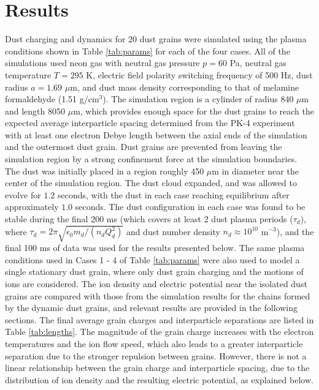 \documentclass[aip,amsmath,amssymb,graphicx,floatfix,reprint]{revtex4-1}
\begin{document}
\section{Results}
\label{results}
Dust charging and dynamics for 20 dust grains were simulated using the plasma conditions shown in Table \ref{tab:params} for each of the four cases.  All of the simulations used neon gas with neutral gas pressure $p = 60$ Pa, neutral gas temperature $T= 295$ K, electric field polarity switching frequency of 500 Hz, dust radius $a = 1.69$ $ \mu$m, and dust mass density corresponding to that of melamine formaldehyde (1.51 g/cm$^3$).  The simulation region is a cylinder of radius 840 $\mu$m and length 8050 $\mu$m, which provides enough space for the dust grains to reach the expected average interparticle spacing determined from the PK-4 experiment with at least one electron Debye length between the axial ends of the simulation and the outermost dust grain.  Dust grains are prevented from leaving the simulation region by a strong confinement force at the simulation boundaries.  The dust was initially placed in a region roughly 450 $\mu$m in diameter near the center of the simulation region.  The dust cloud expanded, and was allowed to evolve for $1.2$ seconds, with the dust in each case reaching equilibrium after approximately $1.0$ seconds.  The dust configuration in each case was found to be stable during the final 200 ms (which covers at least 2 dust plasma periods ($\tau_d$), where $\tau_d = 2\pi \sqrt{\epsilon_0 m_d/(n_{d}Q_d^2)}$ and dust number density $n_d \approx 10^{10}$ m$^{-3}$), and the final 100 ms of data was used for the results presented below.  The same plasma conditions used in Cases 1 - 4 of Table \ref{tab:params} were also used to model a single stationary dust grain, where only dust grain charging and the motions of ions are considered.  The ion density and electric potential near the isolated dust grains are compared with those from the simulation results for the chains formed by the dynamic dust grains, and relevant results are provided in the following sections.  The final average grain charges and interparticle separations are listed in Table \ref{tab:lengths}.  The magnitude of the grain charge increases with the electron temperatures and the ion flow speed, which also leads to a greater interparticle separation due to the stronger repulsion between grains.  However, there is not a linear relationship between the grain charge and interparticle spacing, due to the distribution of ion density and the resulting electric potential, as explained below.
\end{document}
